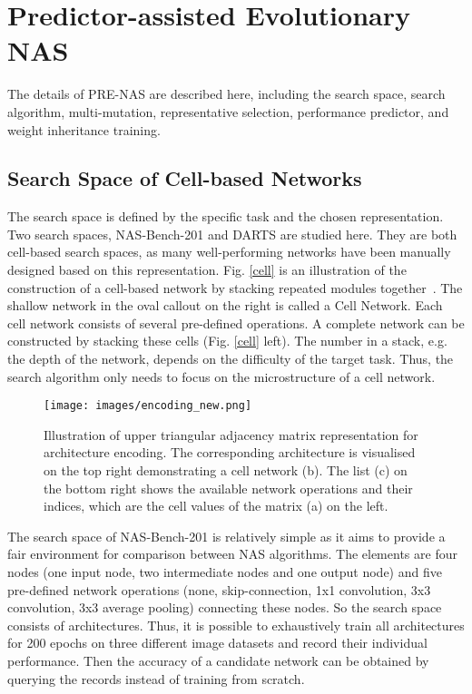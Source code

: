 \documentclass[sigconf]{acmart}
\begin{document}
\section{Predictor-assisted Evolutionary NAS}
\label{section3}
The details of PRE-NAS are described here, including the search space, search algorithm, multi-mutation, representative selection, performance predictor, and weight inheritance training.

\subsection{Search Space of Cell-based Networks}
\label{search_space}
The search space is defined by the specific task and the chosen representation.  Two search spaces, NAS-Bench-201 \cite{Ref:45} and DARTS \cite{Ref:10} are studied here.  They are both cell-based search spaces, as many well-performing networks have been manually designed based on this representation.  Fig. \ref{cell} is an illustration of the construction of a cell-based network by stacking repeated modules together~\cite{Ref:04,Ref:47}.  The shallow network in the oval callout on the right is called a Cell Network. Each cell network consists of several pre-defined operations. A complete network can be constructed by stacking these cells (Fig. \ref{cell} left).  The number in a stack, e.g. the depth of the network, depends on the difficulty of the target task.  Thus, the search algorithm only needs to focus on the microstructure of a cell network.

 \begin{figure*}[!t]
    \begin{center}
  	\texttt{[image: images/encoding\_new.png]}
  \caption{Illustration of upper triangular adjacency matrix representation for architecture encoding. The corresponding architecture is visualised on the top right demonstrating a cell network (b).  The list (c) on the bottom right shows the available network operations and their indices, which are the cell values of the matrix (a) on the left.}
\label{encoding}
  	\end{center}
\end{figure*} 

The search space of NAS-Bench-201 \cite{Ref:45} is relatively simple as it aims to provide a fair environment for comparison between NAS algorithms. The elements are four nodes (one input node, two intermediate nodes and one output node) and five pre-defined network operations (none, skip-connection, 1x1 convolution, 3x3 convolution, 3x3 average pooling) connecting these nodes. So the search space consists of  architectures.  Thus, it is possible to exhaustively train all  architectures for 200 epochs on three different image datasets and record their individual performance. Then the accuracy of a candidate network can be obtained by querying the records instead of training from scratch.
\end{document}
